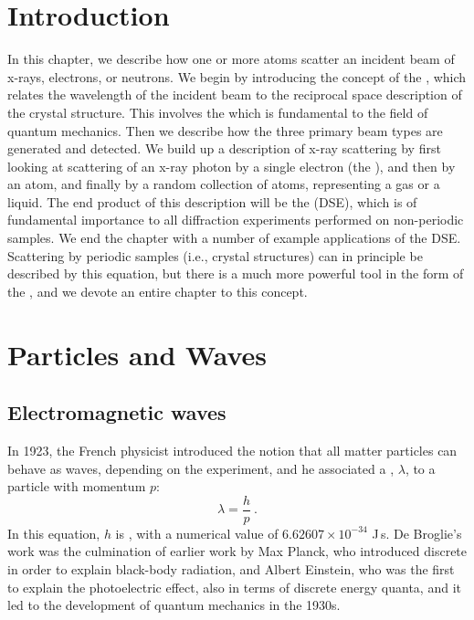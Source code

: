 \section{Introduction}\label{\chabbr:sec:introduction}

In this chapter, we describe how one or more atoms scatter an incident beam of x-rays, electrons, or neutrons.  We begin by introducing the concept of the , which relates the wavelength of the incident beam to the reciprocal space description of the crystal structure. This involves the  which is fundamental to the field of quantum mechanics. Then we describe how the three primary beam types are generated and detected.  We build up a description of x-ray scattering by first looking at scattering of an x-ray photon by a single electron (the ), and then by an atom, and finally by a random collection of atoms, representing a gas or a liquid.  The end product of this description will be the  (DSE), which is of fundamental importance to all diffraction experiments performed on non-periodic samples. We end the chapter with a number of example applications of the DSE.  Scattering by periodic samples (i.e., crystal structures) can in principle be described by this equation, but there is a much more powerful tool in the form of the , and we devote an entire chapter to this concept.

\section{Particles and Waves}\label{\chabbr:sec:particlewaves}

\subsection{Electromagnetic waves}\label{\chabbr:ssec:EMwaves}
In 1923, the French physicist  introduced the notion that all matter particles can behave as waves, depending on the experiment, and he associated a , $\lambda$, to a particle with momentum $p$:
\begin{equation}
	\lambda = \frac{h}{p}\ .\label{\chabbr:eq:debroglie}
\end{equation}
In this equation, $h$ is , with a numerical value of $6.62607\times 10^{-34}$ J\,s.  De Broglie's work was the culmination of earlier work by Max Planck, who introduced discrete  in order to explain black-body radiation, and Albert Einstein, who was the first to explain the photoelectric effect, also in terms of discrete energy quanta, and it led to the development of quantum mechanics in the 1930s.  

